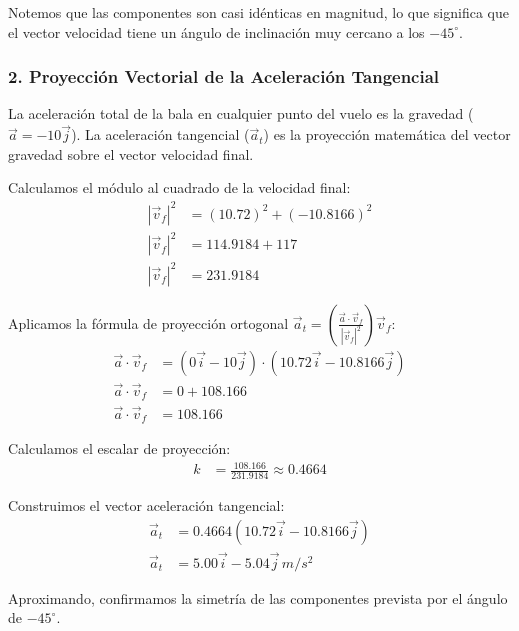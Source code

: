 \documentclass[12pt, a4paper]{article}
\begin{document}
Notemos que las componentes son casi idénticas en magnitud, lo que significa que el vector velocidad tiene un ángulo de inclinación muy cercano a los $-45^\circ$.

\subsubsection*{2. Proyección Vectorial de la Aceleración Tangencial}
La aceleración total de la bala en cualquier punto del vuelo es la gravedad ($\vec{a} = -10\vec{j}$). La aceleración tangencial ($\vec{a}_t$) es la proyección matemática del vector gravedad sobre el vector velocidad final.

Calculamos el módulo al cuadrado de la velocidad final:
\begin{align*}
|\vec{v}_f|^2 &= (10.72)^2 + (-10.8166)^2 \\
|\vec{v}_f|^2 &= 114.9184 + 117 \\
|\vec{v}_f|^2 &= 231.9184
\end{align*}

Aplicamos la fórmula de proyección ortogonal $\vec{a}_t = \left( \frac{\vec{a} \cdot \vec{v}_f}{|\vec{v}_f|^2} \right) \vec{v}_f$:
\begin{align*}
\vec{a} \cdot \vec{v}_f &= (0\vec{i} - 10\vec{j}) \cdot (10.72\vec{i} - 10.8166\vec{j}) \\
\vec{a} \cdot \vec{v}_f &= 0 + 108.166 \\
\vec{a} \cdot \vec{v}_f &= 108.166
\end{align*}

Calculamos el escalar de proyección:
\begin{align*}
k &= \frac{108.166}{231.9184} \approx 0.4664
\end{align*}

Construimos el vector aceleración tangencial:
\begin{align*}
\vec{a}_t &= 0.4664 (10.72\vec{i} - 10.8166\vec{j}) \\
\vec{a}_t &= 5.00\vec{i} - 5.04\vec{j} \, \si{m/s^2}
\end{align*}

Aproximando, confirmamos la simetría de las componentes prevista por el ángulo de $-45^\circ$.
\end{document}
